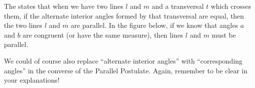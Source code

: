 \documentclass{ximera}
\begin{document}
\begin{definition}
The  states that when we have two lines $l$ and $m$ and a transversal $t$ which crosses them, if the alternate interior angles formed by that transversal are equal, then the two lines $l$ and $m$ are parallel. In the figure below, if we know that angles $a$ and $b$ are congruent (or have the same measure), then lines $l$ and $m$ must be parallel.

\begin{image}
\end{image}

\end{definition}

We could of course also replace ``alternate interior angles'' with ``corresponding angles'' in the converse of the Parallel Postulate. Again, remember to be clear in your explanations!
\end{document}
